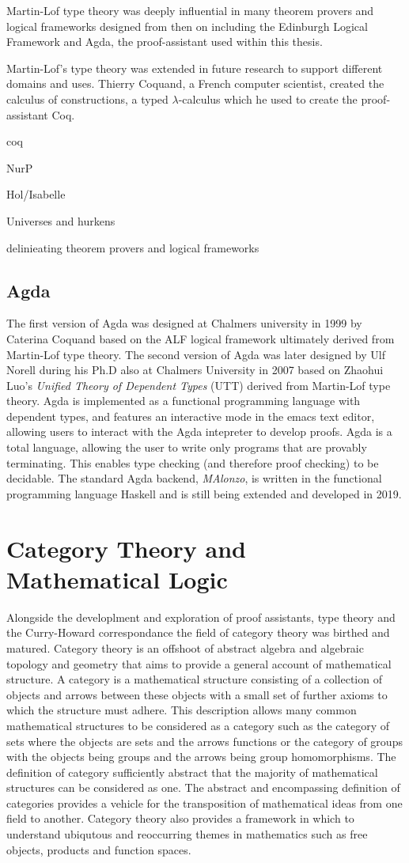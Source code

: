 Martin-Lof type theory was deeply influential in many theorem provers and
logical frameworks designed from then on including the Edinburgh Logical
Framework and  Agda, the proof-assistant used within this thesis.

Martin-Lof's type theory was extended in future research to support different
domains and uses. Thierry Coquand, a French computer scientist, created the
calculus of constructions, a typed $\lambda$-calculus which he used to create
the proof-assistant Coq.

coq

NurP

Hol/Isabelle

Universes and hurkens

delinieating theorem provers and logical frameworks

\subsection{Agda}
The first version of Agda was designed at Chalmers university in 1999 by
Caterina Coquand based on the ALF logical framework ultimately derived from
Martin-Lof type theory. The second version of Agda was later designed by Ulf
Norell during his Ph.D also at Chalmers University in 2007 based on Zhaohui Luo's
\textit{Unified Theory of Dependent Types} (UTT) derived from Martin-Lof type
theory. Agda is implemented as a functional programming language with dependent
types, and features an interactive mode in the emacs text editor, allowing users
to interact with the Agda intepreter to develop proofs. Agda is a total
language, allowing the user to write only programs that are provably
terminating. This enables type checking (and therefore proof checking) to be
decidable. The standard Agda backend, \textit{MAlonzo}, is written in the
functional programming language Haskell and is still being extended and
developed in 2019.
\section{Category Theory and Mathematical Logic}
Alongside the developlment and exploration of  proof assistants, type theory and
the Curry-Howard correspondance the field of category theory was birthed and
matured. Category theory is an offshoot of abstract algebra and algebraic
topology and geometry that aims to provide a general account of mathematical
structure. A category is a mathematical structure consisting of a collection of
objects and arrows between these objects with a small set of further axioms to
which the structure must adhere. This description allows many common
mathematical structures to be considered as a category such as the category of
sets where the objects are sets and the arrows functions or the category of
groups with the objects being groups and the arrows being group homomorphisms.
The definition of category sufficiently abstract that the majority of
mathematical structures can be considered as one. The abstract and encompassing
definition of categories provides a vehicle for the transposition of
mathematical ideas from one field to another. Category theory also provides a
framework in which to understand ubiqutous and reoccurring themes in mathematics
such as free objects, products and function spaces.
